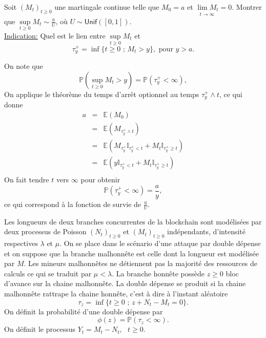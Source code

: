 \documentclass[11pts]{exam}
\newcommand*{\UnifDist}{\mathsf{Unif}}
\newcommand*{\Prob}{\mathbb{P}}
\newcommand*{\E}{\mathbb{E}}
\newcommand*{\ind}{\mathbb{I}}
\begin{document}
\begin{questions}
\question Soit $(M_t)_{t\geq 0}$ une martingale continue telle que $M_0 = a$ et $\underset{t\rightarrow\infty}{\lim M_t} = 0$. Montrer que $\underset{t\geq 0}{\sup}M_t\sim \frac{a}{U}$, où $U\sim\UnifDist([0, 1])$.\\
\underline{Indication:} Quel est le lien entre $\underset{t\geq 0}{\sup}M_t$ et $$
\tau_y^+ = \inf\{t\geq 0\text{ ; }M_t>y\},\text{ pour }y>	a.
$$
\begin{solution}
On note que 
$$
\Prob(\underset{t\geq 0}{\sup}M_t >y) = \Prob(\tau_y^+ <\infty),
$$
On applique le théorème du temps d'arrêt optionnel au temps $\tau_y^+\land t$, ce qui donne
\begin{eqnarray*}
a&=&\E(M_0)\\
&=&\E(M_{\tau_y^+\land t})\\
&=&\E(M_{\tau_y^+}\ind_{\tau_y^+ < t} + M_{t}\ind_{\tau_y^+ \geq t})\\
&=&\E(y\ind_{\tau_y^+ < t} + M_{t}\ind_{\tau_y^+ \geq t})\\
\end{eqnarray*}
On fait tendre $t$ vers $\infty$ pour obtenir
$$
\Prob(\tau_y^+ < \infty) = \frac ay,
$$
ce qui correspond à la fonction de survie de $\frac aU$.
\end{solution}
\question Les longueurs de deux branches concurrentes de la blockchain sont modélisées par deux processus de Poisson $(N_t)_{t\geq 0}$ et $(M_t)_{t\geq 0}$ indépendants, d'intensité respectives $\lambda$ et $\mu$. On se place dans le scénario d'une attaque par double dépense et on suppose que la branche malhonnête est celle dont la longueur est modélisée par $M$. Les mineurs malhonnêtes ne détiennent pas la majorité des ressources de calculs ce qui se traduit par $\mu < \lambda$. La branche honnête possède $z\geq 0$ bloc d'avance sur la chaine malhonnête. La double dépense se produit si la chaine malhonnête rattrape la chaine honnête, c'est à dire à l'instant aléatoire 
$$
\tau_z = \inf\{t\geq 0\text{ ; }z + N_t - M_t = 0\}.
$$
On définit la probabilité d'une double dépense par 
$$
\phi(z) = \Prob(\tau_z <\infty).
$$
On définit le processus $Y_t = M_t - N_t,\text{ }t\geq 0$.
\begin{parts}

\end{parts}
\end{questions}
\end{document}
